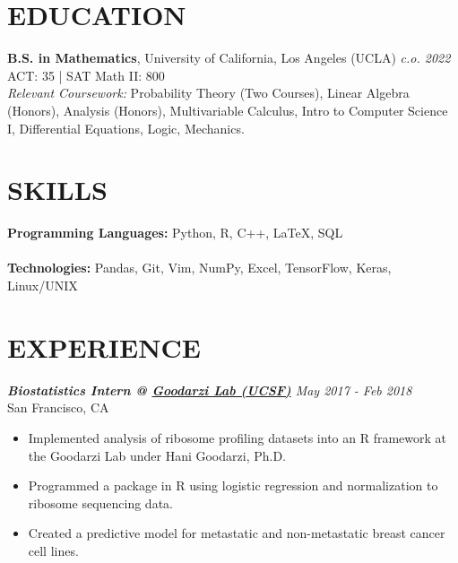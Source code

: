 \documentclass[margin, 10pt]{res} %
\begin{document}
\begin{resume}


\section{\large EDUCATION}

{\bf B.S. in Mathematics}, University of California, Los Angeles (UCLA) \hfill{\sl c.o. 2022}\\
ACT: 35 | SAT Math II: 800\\
{\sl Relevant Coursework:} Probability Theory (Two Courses), Linear Algebra (Honors), Analysis (Honors), Multivariable Calculus, Intro to Computer Science I, Differential Equations, Logic, Mechanics.

\section{\large SKILLS} 

{\bf Programming Languages:} 
Python, R, C++, {\LaTeX}, SQL \\ \\
{\bf Technologies:}
Pandas, Git, Vim, NumPy, Excel, TensorFlow, Keras, Linux/UNIX
 
\section{\large EXPERIENCE}

{\sl {\bf Biostatistics Intern @ \href {https://goodarzilab.ucsf.edu/}{Goodarzi Lab (UCSF)}} \hfill May 2017 - Feb 2018} \\
San Francisco, CA

\begin{itemize} \itemsep -1pt %
\item Implemented analysis of ribosome profiling datasets into an R framework at the Goodarzi Lab under Hani Goodarzi, Ph.D. 
\item Programmed a package in R using logistic regression and normalization to ribosome sequencing data.
\item Created a predictive model for metastatic and non-metastatic breast cancer cell lines.
\end{itemize}
 

\end{resume}
\end{document}
